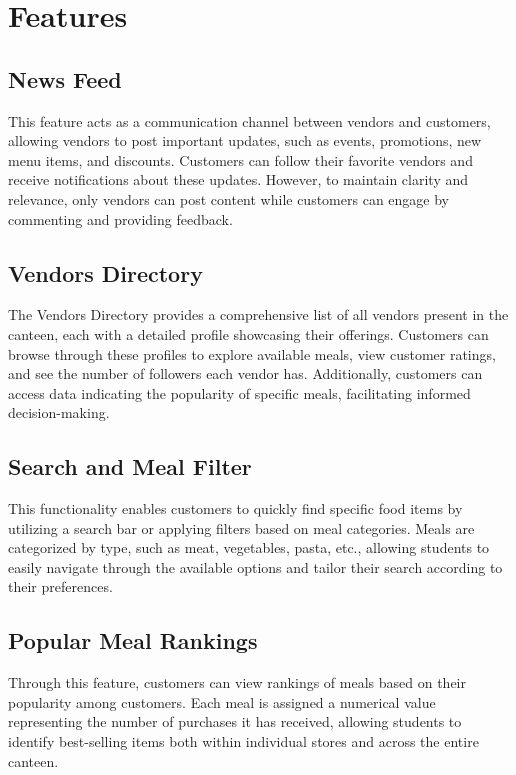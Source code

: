 \section{Features}

\subsection{News Feed}
This feature acts as a communication channel between vendors and customers, allowing vendors to post important updates, such as events, promotions, new menu items, and discounts. Customers can follow their favorite vendors and receive notifications about these updates. However, to maintain clarity and relevance, only vendors can post content while customers can engage by commenting and providing feedback.

\subsection{Vendors Directory}
The Vendors Directory provides a comprehensive list of all vendors present in the canteen, each with a detailed profile showcasing their offerings. Customers can browse through these profiles to explore available meals, view customer ratings, and see the number of followers each vendor has. Additionally, customers can access data indicating the popularity of specific meals, facilitating informed decision-making.

\subsection{Search and Meal Filter}
This functionality enables customers to quickly find specific food items by utilizing a search bar or applying filters based on meal categories. Meals are categorized by type, such as meat, vegetables, pasta, etc., allowing students to easily navigate through the available options and tailor their search according to their preferences.

\subsection{Popular Meal Rankings}
Through this feature, customers can view rankings of meals based on their popularity among customers. Each meal is assigned a numerical value representing the number of purchases it has received, allowing students to identify best-selling items both within individual stores and across the entire canteen.

